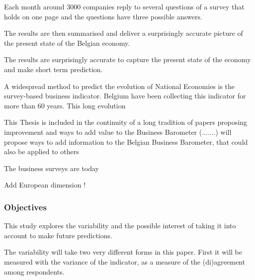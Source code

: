 \documentclass[12pt,a4paper,oneside]{book}
\begin{document}
Each month around 3000 companies reply to several questions of a survey that holds on one page and the questions have three possible answers.

The results are then summarised and deliver a surprisingly accurate picture of the present state of the Belgian economy.



The results are surprisingly accurate to capture the present state of the economy and make short term prediction.


A widespread method to predict the evolution of National Economies is the survey-based business indicator. Belgium have been collecting this indicator for more than 60 years. This long evolution 




This Thesis is included in the continuity of a long tradition of papers proposing improvement and ways to add value to the Business Barometer (.......) will propose ways to add information to the Belgian Business Barometer, that could also be applied to others

The business surveys are today 

Add European dimension !


\subsubsection{Objectives}

This study explores the variability and the possible interest of taking it into account to make future predictions.

The variability will take two very different forms in this paper. 
First it will be measured with the variance of the indicator, as a measure of the (di)agreement among respondents.
\end{document}
